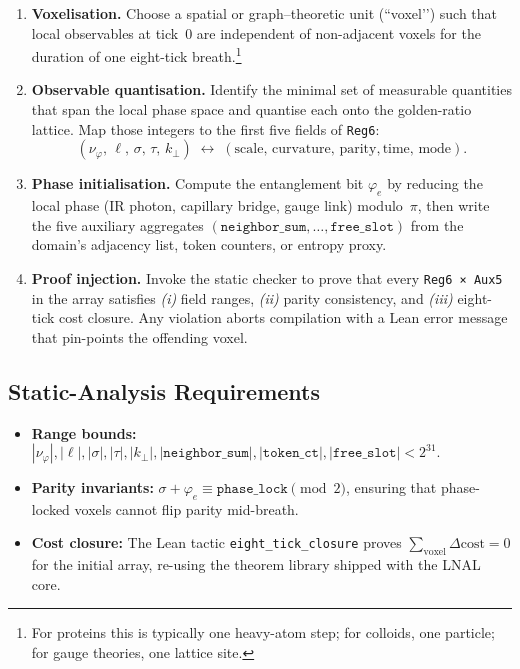 \documentclass[11pt,a4paper]{article}
\begin{document}
\begin{enumerate}
\item \textbf{Voxelisation.}  
      Choose a spatial or graph–theoretic unit (``voxel’’) such that
      local observables at tick~$0$ are independent of non-adjacent
      voxels for the duration of one eight-tick breath.\footnote{For
      proteins this is typically one heavy-atom step;
      for colloids, one particle; for gauge theories, one lattice
      site.}
\item \textbf{Observable quantisation.}  
      Identify the minimal set of measurable quantities that span the
      local phase space and quantise each onto the golden-ratio
      lattice.  Map those integers to the first five fields of
      \texttt{Reg6}:
      \[
      (\nu_{\varphi},\,\ell,\,\sigma,\,\tau,\,k_{\!\perp})
        \;\leftrightarrow\;
      (\text{scale},\,\text{curvature},\,\text{parity},
        \text{time},\,\text{mode}).
      \]
\item \textbf{Phase initialisation.}  
      Compute the entanglement bit $\varphi_{e}$ by reducing the local
      phase (IR photon, capillary bridge, gauge link) modulo~$\pi$,
      then write the five auxiliary aggregates
      $(\texttt{neighbor\_sum},\dots,\texttt{free\_slot})$ from the
      domain’s adjacency list, token counters, or entropy proxy.
\item \textbf{Proof injection.}  
      Invoke the static checker to prove that every
      \verb|Reg6 × Aux5| in the array satisfies
      \emph{(i)} field ranges, \emph{(ii)} parity consistency, and
      \emph{(iii)} eight-tick cost closure.  
      Any violation aborts compilation with a Lean error message that
      pin-points the offending voxel.
\end{enumerate}

\subsection{Static-Analysis Requirements}
\label{subsec:static-analysis}

\begin{itemize}
  \item \textbf{Range bounds:}
        \(
          |\nu_{\varphi}|,|\ell|,|\sigma|,
          |\tau|,|k_{\!\perp}|,
          |\texttt{neighbor\_sum}|,|\texttt{token\_ct}|,|\texttt{free\_slot}|
          < 2^{31}.
        \)
  \item \textbf{Parity invariants:}
        \(\sigma + \varphi_{e} \equiv
          \texttt{phase\_lock} \pmod{2}\),
        ensuring that phase-locked voxels cannot flip parity mid-breath.
  \item \textbf{Cost closure:}  
        The Lean tactic \verb|eight_tick_closure| proves
        \(\sum_{\text{voxel}} \Delta\text{cost} = 0\)
        for the initial array, re-using the theorem library shipped
        with the LNAL core.
\end{itemize}
\end{document}
